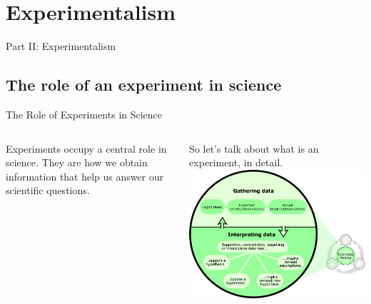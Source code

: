
\section{Experimentalism}
\begin{frame}
  \begin{center}
    Part II: Experimentalism
  \end{center}
\end{frame}

\subsection{The role of an experiment in science}

\begin{frame}{The Role of Experiments in Science}
  \begin{columns}
      Experiments occupy a central role in science.
      They are how we obtain information that help us answer our scientific
      questions.

      \bigskip

      So let's talk about what is an experiment, in detail.
      \includegraphics[width=1\textwidth]{../img/understandingscience_zoom2}
  \end{columns}
\end{frame}

